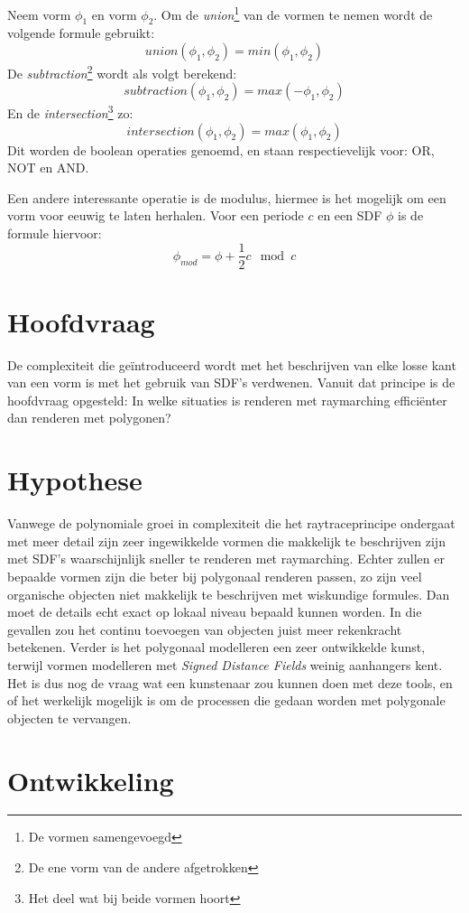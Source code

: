 \documentclass[12pt, a4paper]{article}
\begin{document}
Neem vorm $\phi_1$ en vorm $\phi_2$. Om de \emph{union}\footnote{De vormen samengevoegd} van de vormen te nemen wordt de volgende formule gebruikt: 
\[{union(\phi_1, \phi_2)}=min(\phi_1, \phi_2)\]
De \emph{subtraction}\footnote{De ene vorm van de andere afgetrokken} wordt als volgt berekend:
\[{subtraction(\phi_1, \phi_2)}=max(-\phi_1, \phi_2)\]
En de \emph{intersection}\footnote{Het deel wat bij beide vormen hoort} zo:
\[{intersection(\phi_1, \phi_2)}=max(\phi_1, \phi_2)\]
Dit worden de boolean operaties genoemd, en staan respectievelijk voor: OR, NOT en AND.

Een andere interessante operatie is de modulus, hiermee is het mogelijk om een vorm voor eeuwig te laten herhalen. Voor een periode $c$ en een SDF $\phi$ is de formule hiervoor:
\[\phi_{mod}= \phi +\frac{1}{2}c\mod{c}\]

\clearpage
\section{Hoofdvraag}
De complexiteit die geïntroduceerd wordt met het beschrijven van elke losse kant van een vorm is met het gebruik van SDF's verdwenen. Vanuit dat principe is de hoofdvraag opgesteld:
\newline
\newline
\Large In welke situaties is renderen met raymarching efficiënter dan renderen met polygonen? \normalsize
\section{Hypothese}
Vanwege de polynomiale groei in complexiteit die het raytraceprincipe ondergaat met meer detail zijn zeer ingewikkelde vormen die makkelijk te beschrijven zijn met SDF's waarschijnlijk sneller te renderen met raymarching. Echter zullen er bepaalde vormen zijn die beter bij polygonaal renderen passen, zo zijn veel organische objecten niet makkelijk te beschrijven met wiskundige formules. Dan moet de details echt exact op lokaal niveau bepaald kunnen worden. In die gevallen zou het continu toevoegen van objecten juist meer rekenkracht betekenen. Verder is het polygonaal modelleren een zeer ontwikkelde kunst, terwijl vormen modelleren met \emph{Signed Distance Fields} weinig aanhangers kent. Het is dus nog de vraag wat een kunstenaar zou kunnen doen met deze tools, en of het werkelijk mogelijk is om de processen die gedaan worden met polygonale objecten te vervangen.
\clearpage
\section{Ontwikkeling}
\end{document}
